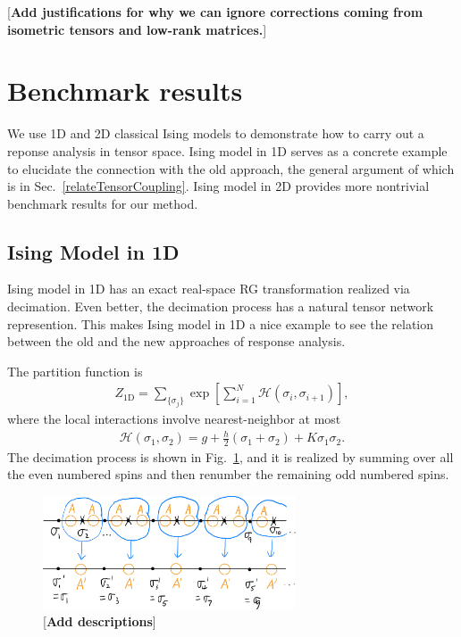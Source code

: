 \documentclass[aps,prb,reprint,superscriptaddress]{revtex4-2}
\begin{document}
[\textbf{Add justifications for why we can ignore corrections coming from
isometric tensors and low-rank matrices.}]

\section{Benchmark results\label{benchmark}}
We use 1D and 2D classical Ising models to demonstrate how to carry out
a reponse analysis in tensor space. Ising model in 1D serves as a
concrete example to elucidate the connection with the old approach, the
general argument of which is in Sec.~\ref{relateTensorCoupling}. Ising
model in 2D provides more nontrivial benchmark results for our method.
%

\subsection{Ising Model in 1D\label{benchmark:1DIsing}}
Ising model in 1D has an exact real-space RG transformation realized via
decimation. Even better, the decimation process has a natural tensor
network represention. This makes Ising model in 1D a nice example to see
the relation between the old and the new approaches of response
analysis.
%

The partition function is
%
\begin{align}\label{def:Z4Ising1D}
    Z_{\text{1D}} = \sum_{\{\sigma_j \} } \exp{\left[\sum_{i=1}^N
    \mathscr{H}\left(\sigma_i,\sigma_{i+1}\right)  \right]},
\end{align}
%
where the local interactions involve nearest-neighbor at most
%
\begin{align}\label{def:H4Ising1D}
    \mathscr{H}\left(\sigma_1, \sigma_2\right) = g +
    \frac{h}{2}\left(\sigma_1 + \sigma_2\right) + K\sigma_1 \sigma_2.
\end{align}
%
The decimation process is shown in Fig.~\ref{fig:Ising1D-decimation},
and it is realized by summing over all the even numbered spins and then
renumber the remaining odd numbered spins. 
%
\begin{figure}[h]
    \includegraphics[width=7.5cm]{./figs/Ising1D-decimation}
    \caption{\label{fig:Ising1D-decimation}[\textbf{Add descriptions}]}
\end{figure}
%
\end{document}
